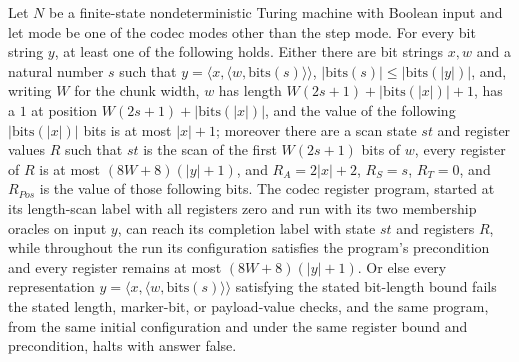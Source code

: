 \begin{theorem}
\label{Complexity.Codec.one_run}
\leanok
{}
Let $N$ be a finite-state nondeterministic Turing machine with Boolean input and let
$\mathrm{mode}$ be one of the codec modes other than the step mode. For every bit string
$y$, at least one of the following holds. Either there are bit strings $x,w$ and a
natural number $s$ such that $y=\langle x,\langle w,\mathrm{bits}(s)\rangle\rangle$,
$|\mathrm{bits}(s)|\leq |\mathrm{bits}(|y|)|$, and, writing $W$ for the chunk width, $w$
has length $W(2s+1)+|\mathrm{bits}(|x|)|+1$, has a $1$ at position
$W(2s+1)+|\mathrm{bits}(|x|)|$, and the value of the following $|\mathrm{bits}(|x|)|$
bits is at most $|x|+1$; moreover there are a scan state $st$ and register values $R$
such that $st$ is the scan of the first $W(2s+1)$ bits of $w$, every register of $R$ is
at most $(8W+8)(|y|+1)$, and $R_A=2|x|+2$, $R_S=s$, $R_T=0$, and $R_{Pos}$ is the value
of those following bits. The codec register program, started at its length-scan label
with all registers zero and run with its two membership oracles on input $y$, can reach
its completion label with state $st$ and registers $R$, while throughout the run its
configuration satisfies the program’s precondition and every register remains at most
$(8W+8)(|y|+1)$. Or else every representation $y=\langle x,\langle
w,\mathrm{bits}(s)\rangle\rangle$ satisfying the stated bit-length bound fails the
stated length, marker-bit, or payload-value checks, and the same program, from the same
initial configuration and under the same register bound and precondition, halts with
answer false.
\end{theorem}

